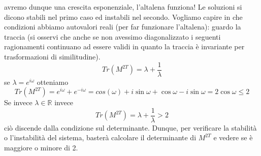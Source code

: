 \documentclass[
10pt, %
a4paper, %
oneside, %
headinclude,footinclude, %
BCOR5mm, %
]{scrartcl}
\begin{document}
avremo dunque una crescita esponenziale, l'altalena funziona! Le soluzioni si dicono stabili nel primo caso ed instabili nel secondo. Vogliamo capire in che condizioni abbiamo autovalori reali (per far funzionare l'altalena): guardo la traccia (si osservi che anche se non avessimo diagonalizzato i seguenti ragionamenti continuano ad essere validi in quanto la traccia è invariante per trasformazioni di similitudine). 
\[Tr(M^{2T}) = \lambda + \frac{1}{\lambda}\]
se \(\lambda = e^{i\omega}\) otteniamo
\[Tr(M^{2T}) = e^{i\omega} + e^{-i\omega} = cos(\omega)+i\sin\omega+\cos\omega - i \sin \omega = 2\cos\omega \leq 2\]
Se invece \(\lambda \in \mathbb{R}\) invece
\[Tr(M^{2T}) = \lambda + \frac{1}{\lambda} >2\]
ciò discende dalla condizione sul determinante. Dunque, per verificare la stabilità o l'instabilità del sistema, basterà calcolare il determinante di \(M^{2T}\) e vedere se è maggiore o minore di 2.
\newpage
\end{document}
